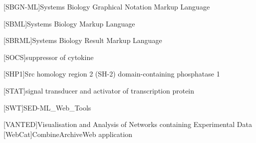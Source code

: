 \begin{acronym}[acrmeta]
        [SBGN-ML]{Systems Biology Graphical Notation Markup Language}
        
        [SBML]{Systems Biology Markup Language}
        
        [SBRML]{Systems Biology Result Markup Language}
        
        [SOCS]{suppressor of cytokine}
        
        [SHP1]{Src homology region 2 (SH-2) domain-containing phosphatase 1}
        
        [STAT]{signal transducer and activator of transcription protein}        
                
        [SWT]{SED-ML\_Web\_Tools}
        
        [VANTED]{Visualisation and Analysis of Networks containing Experimental Data}
        [WebCat]{CombineArchiveWeb application}

    \end{acronym}